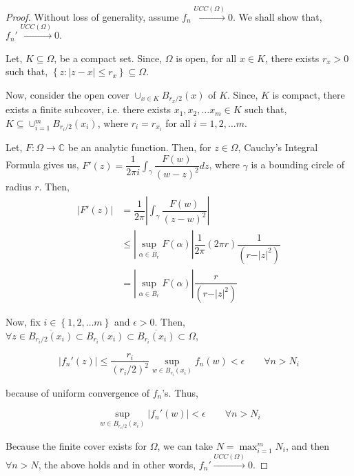 \documentclass[12pt]{article}
\newcommand{\C}{\mathbb{C}}
\theoremstyle{definition}
\newenvironment{note}{
\begin{tcolorbox}[colback=blue!5!white,colframe=blue!75!black,title=Note, parbox = false] }{\end{tcolorbox} }
\begin{document}
\begin{proof}
    Without loss of generality, assume $f_n \xrightarrow{UCC(\Omega)} 0$. We shall show that, $f_n' \xrightarrow{UCC(\Omega)} 0$.

    Let, $K \subseteq \Omega$, be a compact set. Since, $\Omega$ is open, for all $x \in K$, there exists $r_x > 0$ such that, $\left\{ z : \vert z - x \vert \leq r_x\right\} \subseteq \Omega$. 
    
    Now, consider the open cover $\cup_{x \in K} B_{r_x / 2}(x)$ of $K$. Since, $K$ is compact, there exists a finite subcover, i.e. there exists $x_1, x_2, \dots x_m \in K$ such that, $K \subseteq \cup_{i=1}^{m} B_{r_i/2}(x_i)$, where $r_i = r_{x_i}$ for all $i = 1, 2, \dots m$.

    \begin{note}
        Let, $F: \Omega \rightarrow \C$ be an analytic function. Then, for $z \in \Omega$, Cauchy's Integral Formula gives us, $F'(z) = \dfrac{1}{2\pi i} \int_\gamma \dfrac{F(w)}{(w - z)^2} dz$, where $\gamma$ is a bounding circle of radius $r$. Then,
        \begin{align*}
            \vert F'(z)\vert
            & = \dfrac{1}{2\pi} \left\vert \int_\gamma \dfrac{F(w)}{(z - w)^2} \right\vert\\
            & \leq \left\vert \sup_{\alpha \in \overline{B_r}} F(\alpha) \right\vert \dfrac{1}{2\pi} (2\pi r) \dfrac{1}{(r - \vert z \vert^2)}\\
            & = \left\vert \sup_{\alpha \in \overline{B_r}} F(\alpha) \right\vert \dfrac{r}{(r - \vert z \vert^2)}
        \end{align*}
    \end{note}

    Now, fix $i \in \left\{ 1, 2, \dots m\right\}$ and $\epsilon > 0$. Then, $\forall z \in \overline{B_{r_i/2}(x_i)} \subset B_{r_i}(x_i) \subset \overline{B_{r_i}(x_i)} \subset \Omega$,

    $$\vert f_n'(z) \vert \leq \dfrac{r_i}{(r_i / 2)^2} \sup_{w \in B_{r_i}(x_i)} f_n(w) < \epsilon \qquad \forall n > N_i$$

    because of uniform convergence of $f_n$'s. Thus, 

    $$\sup_{w \in B_{r_i/2}(x_i)} \vert f_n'(w) \vert < \epsilon \qquad \forall n > N_i$$

    Because the finite cover exists for $\Omega$, we can take $N = \max_{i = 1}^{m} N_i$, and then $\forall n > N$, the above holds and in other words, $f_n' \xrightarrow{UCC(\Omega)} 0$.
\end{proof}
\end{document}
